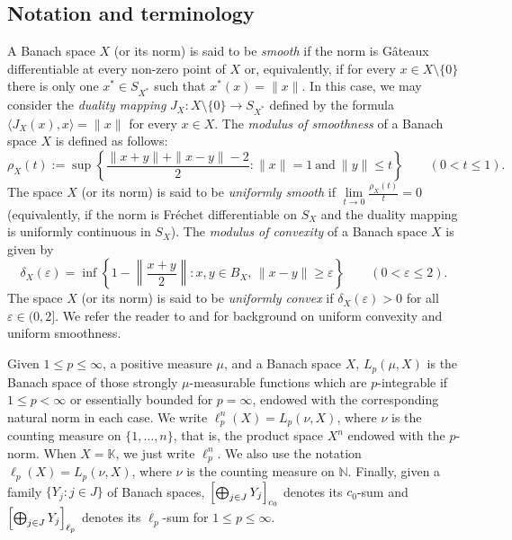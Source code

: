 \documentclass[a4paper,10pt]{amsart}
\theoremstyle{plain}
\theoremstyle{definition}
\newcommand{\K}{\mathbb{K}}
\newcommand{\N}{\mathbb{N}}
\newcommand{\eps}{\varepsilon}
\renewcommand{\geq}{\geqslant}
\renewcommand{\leq}{\leqslant}
\begin{document}
\subsection{Notation and terminology}\label{subsection-notation}
A Banach space $X$ (or its norm) is said to be \emph{smooth} if the norm is G\^{a}teaux differentiable at every non-zero point of $X$ or, equivalently, if for every $x\in X\setminus \{0\}$ there is only one $x^*\in S_{X^*}$ such that $x^*(x)=\|x\|$. In this case, we may consider the \emph{duality mapping} $J_X:X\setminus\{0\}\longrightarrow S_{X^*}$ defined by the formula $\langle J_X(x),x\rangle = \|x\|$ for every $x\in X$. The \emph{modulus of smoothness} of a Banach space $X$ is defined as follows:
\begin{equation*}
\rho_X (t) := \sup \left\{\frac{\|x + y\|+\|x - y\|-2}{2} \colon \|x\| = 1 \ \text{and} \ \|y\| \leq t  \right\} \qquad (0<t\leq 1).	
\end{equation*}
The space $X$ (or its norm) is said to be \emph{uniformly smooth} if $\displaystyle\lim\limits_{t\to 0}\frac{\rho_X(t)}{t}=0$ (equivalently, if the norm is Fr\'{e}chet differentiable on $S_X$ and the duality mapping is uniformly continuous in $S_X$).
The \emph{modulus of convexity} of a Banach space $X$ is given by
$$
\delta_X(\eps)=\inf\left\{1-\left\|\frac{x+y}{2}\right\|\colon x,y\in B_X,\, \|x-y\|\geq \eps\right\} \qquad (0<\eps\leq 2).
$$
The space $X$ (or its norm) is said to be \emph{uniformly convex} if $\delta_X(\eps)>0$ for all $\eps\in (0,2]$. We refer the reader to \cite[\S 9]{FHHMPZ} and \cite{Diestel} for background on uniform convexity and uniform smoothness.

Given $1\leq p \leq \infty$, a positive measure $\mu$, and a Banach space $X$, $L_p(\mu,X)$ is the Banach space of those strongly $\mu$-measurable functions which are $p$-integrable if $1\leq p<\infty$ or essentially bounded for $p=\infty$, endowed with the corresponding natural norm in each case. We write $\ell_p^n(X)=L_p(\nu,X)$, where $\nu$ is the counting measure on $\{1,\ldots,n\}$, that is, the product space $X^n$ endowed with the $p$-norm. When $X=\K$, we just write $\ell_p^n$. We also use the notation $\ell_p(X)=L_p(\nu,X)$, where $\nu$ is the counting measure on $\N$. Finally, given a family $\{Y_j\colon j\in J\}$ of Banach spaces, $\Bigl[ \bigoplus_{j \in J} Y_j \Bigr]_{c_0}$ denotes its $c_0$-sum and $\Bigl[ \bigoplus_{j \in J} Y_j \Bigr]_{\ell_p}$ denotes its $\ell_p$-sum for $1 \leq p \leq \infty$.
\end{document}
